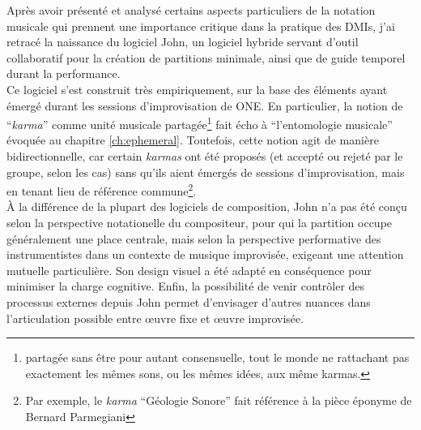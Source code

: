 \noindent Après avoir présenté et analysé certains aspects particuliers de la notation musicale qui prennent une importance critique dans la pratique des \glspl{DMI}, j'ai retracé la naissance du logiciel John, un logiciel hybride servant d'outil collaboratif pour la création de partitions minimale, ainsi que de guide temporel durant la performance.\\
\indent Ce logiciel s'est construit très empiriquement, sur la base des éléments ayant émergé durant les sessions d'improvisation de ONE. En particulier, la notion de ``\textit{karma}'' comme unité musicale partagée\footnote{partagée sans être pour autant consensuelle, tout le monde ne rattachant pas exactement les mêmes sons, ou les mêmes idées, aux même karmas.} fait écho à ``l'entomologie musicale'' évoquée au chapitre \ref{ch:ephemeral}. Toutefois, cette notion agit de manière bidirectionnelle, car certain \textit{karmas} ont été proposés (et accepté ou rejeté par le groupe, selon les cas) sans qu'ils aient émergés de sessions d'improvisation, mais en tenant lieu de référence commune\footnote{Par exemple, le \textit{karma} ``Géologie Sonore'' fait référence à la pièce éponyme de Bernard Parmegiani}.\\
\indent À la différence de la plupart des logiciels de composition, John n'a pas été conçu selon la perspective notationelle du compositeur, pour qui la partition occupe généralement une place centrale, mais selon la perspective performative des instrumentistes dans un contexte de musique improvisée, exigeant une attention mutuelle particulière. Son design visuel a été adapté en conséquence pour minimiser la charge cognitive. Enfin, la possibilité de venir contrôler des processus externes depuis John permet d'envisager d'autres nuances dans l'articulation possible entre œuvre fixe et œuvre improvisée.






